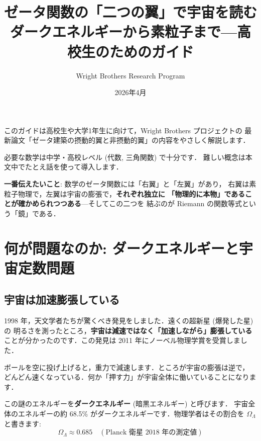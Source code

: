 \documentclass[11pt,a4paper]{article}
\title{ゼータ関数の「二つの翼」で宇宙を読む\\
\large ダークエネルギーから素粒子まで---高校生のためのガイド}
\author{Wright Brothers Research Program}
\date{2026年4月}
\begin{document}
\maketitle

\begin{tcolorbox}[colback=yellow!5,colframe=orange!60!black,title=このガイドについて]
このガイドは高校生や大学1年生に向けて，Wright Brothers プロジェクトの
最新論文「ゼータ建築の摂動的翼と非摂動的翼」の内容をやさしく解説します．

必要な数学は中学・高校レベル (代数, 三角関数) で十分です．
難しい概念は本文中でたとえ話を使って導入します．

\textbf{一番伝えたいこと}: 数学のゼータ関数には「右翼」と「左翼」があり，
右翼は素粒子物理で，左翼は宇宙の膨張で，\textbf{それぞれ独立に
「物理的に本物」であることが確かめられつつある}---そしてこの二つを
結ぶのが Riemann の関数等式という「鏡」である．
\end{tcolorbox}

\tableofcontents

\newpage

\section{何が問題なのか: ダークエネルギーと宇宙定数問題}

\subsection{宇宙は加速膨張している}

1998 年，天文学者たちが驚くべき発見をしました．遠くの超新星 (爆発した星) の
明るさを測ったところ，\textbf{宇宙は減速ではなく「加速しながら」膨張している}
ことが分かったのです．この発見は 2011 年にノーベル物理学賞を受賞しました．

ボールを空に投げ上げると，重力で減速します．ところが宇宙の膨張は逆で，
どんどん速くなっている．何か「押す力」が宇宙全体に働いていることになります．

この謎のエネルギーを\textbf{ダークエネルギー} (暗黒エネルギー) と呼びます．
宇宙全体のエネルギーの約 68.5\% がダークエネルギーです．物理学者はその割合を
$\Omega_\Lambda$ と書きます:
\begin{equation*}
\Omega_\Lambda \approx 0.685 \quad (\text{Planck 衛星 2018 年の測定値})
\end{equation*}
\end{document}
